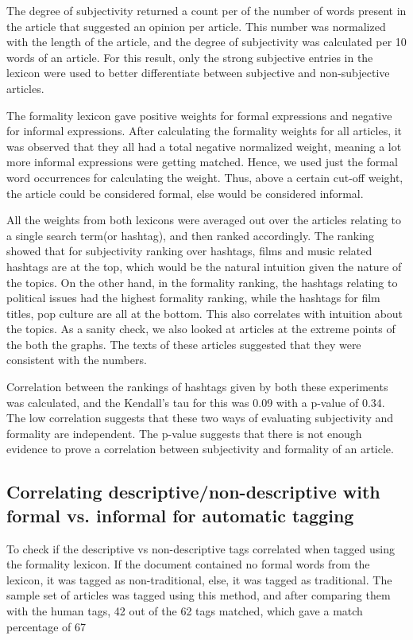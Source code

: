 \documentclass[11pt]{article}
\begin{document}
The degree of subjectivity returned a count per of the number of words present in the article that suggested an opinion per article. This number was normalized with the length of the article, and the degree of subjectivity was calculated per 10 words of an article. For this result, only the strong subjective entries in the lexicon were used to better differentiate between subjective and non-subjective articles.

The formality lexicon gave positive weights for formal expressions and negative for informal expressions. After calculating the formality weights for all articles, it was observed that they all had a total negative normalized weight, meaning a lot more informal expressions were getting matched. Hence, we used just the formal word occurrences for calculating the weight. Thus, above a certain cut-off weight, the article could be considered formal, else would be considered informal.

All the weights from both lexicons were averaged out over the articles relating to a single search term(or hashtag), and then ranked accordingly. The ranking showed that for subjectivity ranking over hashtags, films and music related hashtags are at the top, which would be the natural intuition given the nature of the topics. On the other hand, in the formality ranking, the hashtags relating to political issues had the highest formality ranking, while the hashtags for film titles, pop culture are all at the bottom. This also correlates with intuition about the topics. As a sanity check, we also looked at articles at the extreme points of the both the graphs. The texts of these articles suggested that they were consistent with the numbers.

Correlation between the rankings of hashtags given by both these experiments was calculated, and the Kendall’s tau for this was 0.09 with a p-value of 0.34. The low correlation suggests that these two ways of evaluating subjectivity and formality are independent. The p-value suggests that there is not enough evidence to prove a correlation between subjectivity and formality of an article.

\subsection{Correlating descriptive/non-descriptive with formal vs. informal for automatic tagging}

To check if the descriptive vs non-descriptive tags correlated when tagged using the formality lexicon. If the document contained no formal words from the lexicon, it was tagged as non-traditional, else, it was tagged as traditional. The sample set of articles was tagged using this method, and after comparing them with the human tags, 42 out of the 62 tags matched, which gave a match percentage of 67%
\end{document}
